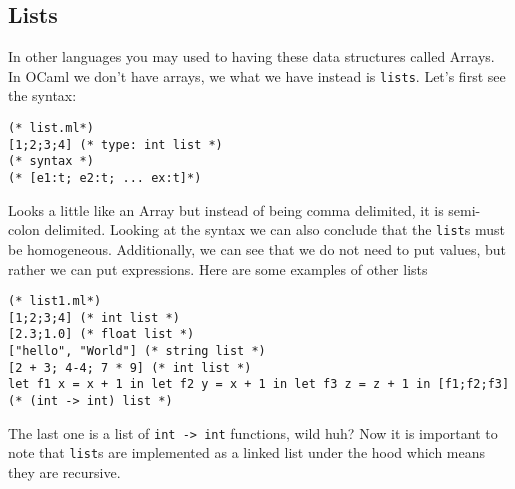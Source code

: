 \documentclass[main.tex]{subfiles}
\begin{document}
\subsection{Lists}
In other languages you may used to having these data structures called Arrays. In OCaml we don't have arrays, we what we have instead is \texttt{lists}. Let's first see the syntax:
\begin{lstlisting}[style=Myocamlstyle]
(* list.ml*)
[1;2;3;4] (* type: int list *)
(* syntax *)
(* [e1:t; e2:t; ... ex:t]*)
\end{lstlisting}
Looks a little like an Array but instead of being comma delimited, it is semi-colon delimited. Looking at the syntax we can also conclude that the \texttt{list}s must be homogeneous. Additionally, we can see that we do not need to put values, but rather we can put expressions. Here are some examples of other lists
\begin{lstlisting}[style=Myocamlstyle]
(* list1.ml*)
[1;2;3;4] (* int list *)
[2.3;1.0] (* float list *)
["hello", "World"] (* string list *)
[2 + 3; 4-4; 7 * 9] (* int list *)
let f1 x = x + 1 in let f2 y = x + 1 in let f3 z = z + 1 in [f1;f2;f3] (* (int -> int) list *)
\end{lstlisting}
The last one is a list of \texttt{int -> int} functions, wild huh? Now it is important to note that \texttt{list}s are implemented as a linked list under the hood which means they are recursive.
\end{document}
